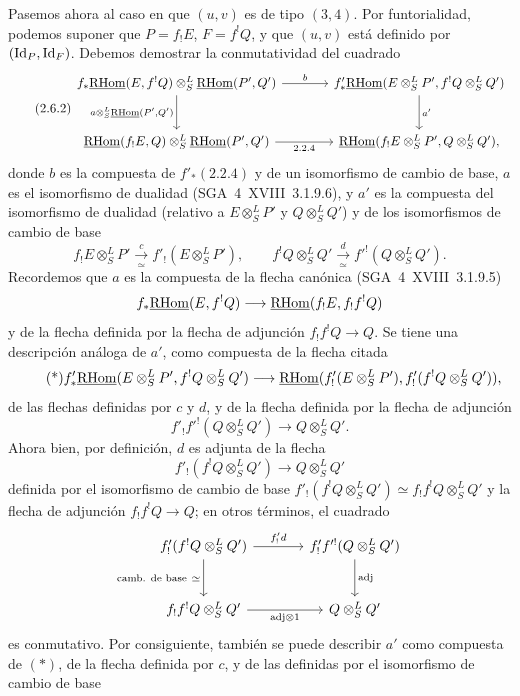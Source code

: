 \enlargethispage{-2\baselineskip}
Pasemos ahora al caso en que $(u,v)$ es de tipo $(3,4)$. Por funtorialidad, podemos suponer que $P=f_{!}E$, $F=f^{!}Q$, y que $(u,v)$ está definido por $(\mathrm{Id}_P,\mathrm{Id}_F)$. Debemos demostrar la conmutatividad del cuadrado
\begin{equation}\tag{2.6.2}
\begin{tikzcd}[column sep=large,row sep=large]
f_*\uRHom(E,f^!Q)\otimes^L_S\uRHom(P',Q') \arrow[r,"b"] \arrow[d,"{a\otimes^L_S\uRHom(P',Q')}"'] & f'_*\uRHom(E\otimes^L_SP',f^!Q\otimes^L_SQ') \arrow[d,"a'"]\\
\uRHom(f_!E,Q)\otimes^L_S\uRHom(P',Q') \arrow[r,"2.2.4"'] & \uRHom(f_!E\otimes^L_SP',Q\otimes^L_SQ'),
\end{tikzcd}
\end{equation}
donde $b$ es la compuesta de $f'_*(2.2.4)$ y de un isomorfismo de cambio de base, $a$ es el isomorfismo de dualidad (SGA~4~XVIII~3.1.9.6), y $a'$ es la compuesta del isomorfismo de dualidad (relativo a $E\otimes^L_SP'$ y $Q\otimes^L_SQ'$) y de los isomorfismos de cambio de base
\[
f_!E\otimes^L_SP'\xrightarrow[\simeq]{c}f'_!(E\otimes^L_SP'),
\qquad
f^!Q\otimes^L_SQ'\xrightarrow[\simeq]{d}f'^!(Q\otimes^L_SQ').
\]
Recordemos que $a$ es la compuesta de la flecha canónica (SGA~4~XVIII~3.1.9.5)
\[
f_*\underline{\mathrm{RHom}}(E,f^!Q)\longrightarrow\underline{\mathrm{RHom}}(f_!E,f_!f^!Q)
\]
y de la flecha definida por la flecha de adjunción $f_!f^!Q\to Q$. Se tiene una descripción análoga de $a'$, como compuesta de la flecha citada
\begin{equation}\tag{*}
f'_*\underline{\mathrm{RHom}}(E\otimes^L_SP',f^!Q\otimes^L_SQ')\longrightarrow
\underline{\mathrm{RHom}}(f'_!(E\otimes^L_SP'),f'_!(f^!Q\otimes^L_SQ')),
\end{equation}
de las flechas definidas por $c$ y $d$, y de la flecha definida por la flecha de adjunción
\[
f'_!f'^!(Q\otimes^L_SQ')\longrightarrow Q\otimes^L_SQ'.
\]
Ahora bien, por definición, $d$ es adjunta de la flecha
\[
f'_!(f^!Q\otimes^L_SQ')\longrightarrow Q\otimes^L_SQ'
\]
definida por el isomorfismo de cambio de base $f'_!(f^!Q\otimes^L_SQ')\simeq f_!f^!Q\otimes^L_SQ'$ y la flecha de adjunción $f_!f^!Q\to Q$; en otros términos, el cuadrado
\[
\begin{tikzcd}[column sep=large,row sep=large]
f'_!(f^!Q\otimes^L_SQ') \arrow[r,"{f'_!d}"] \arrow[d,"{\text{camb. de base}\ \simeq}"'] & f'_!f'^!(Q\otimes^L_SQ') \arrow[d,"\mathrm{adj}"]\\
f_!f^!Q\otimes^L_SQ' \arrow[r,"{\mathrm{adj}\otimes 1}"'] & Q\otimes^L_SQ'
\end{tikzcd}
\]
es conmutativo. Por consiguiente, también se puede describir $a'$ como compuesta de $(*)$, de la flecha definida por $c$, y de las definidas por el isomorfismo de cambio de base
